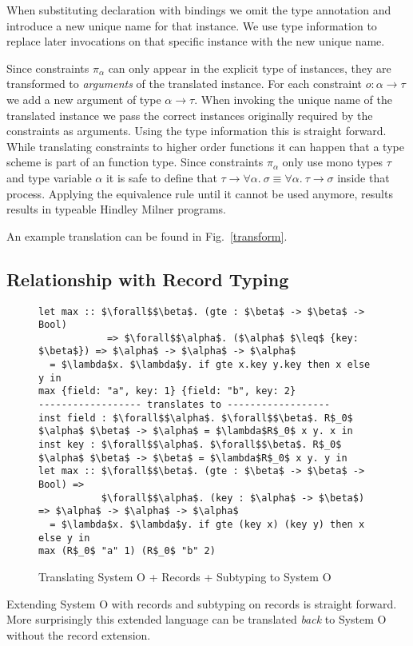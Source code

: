 \documentclass[runningheads]{llncs}
\newcommand{\snip}[1]{\footnotesize{\ttfamily{#1}}}
\begin{document}
When substituting \snip{inst} declaration with \snip{let} bindings we omit the type annotation and introduce a new unique name for that instance. 
We use type information to replace later invocations on that specific instance with the new unique name. 

Since constraints $\pi_\alpha$ can only appear in the explicit type of instances, they are transformed to \emph{arguments} of the translated instance.
For each constraint $o : \alpha \rightarrow \tau$ we add a new argument of type $\alpha \rightarrow \tau$. 
When invoking the unique name of the translated instance we pass the correct instances originally required by the constraints as arguments. 
Using the type information this is straight forward. 
While translating constraints to higher order functions it can happen that a type scheme is part of an function type. 
Since constraints $\pi_\alpha$ only use mono types $\tau$ and type variable $\alpha$ it is safe to define that $\tau \rightarrow \forall \alpha. \ \sigma \equiv \forall \alpha. \ \tau \rightarrow \sigma$ inside that process.
Applying the equivalence rule until it cannot be used anymore, results results in typeable Hindley Milner programs.

An example translation can be found in Fig.~\ref{transform}.

\subsection{Relationship with Record Typing}
\begin{figure}
  \begin{lstlisting}
let max :: $\forall$$\beta$. (gte : $\beta$ -> $\beta$ -> Bool) 
            => $\forall$$\alpha$. ($\alpha$ $\leq$ {key: $\beta$}) => $\alpha$ -> $\alpha$ -> $\alpha$      
  = $\lambda$x. $\lambda$y. if gte x.key y.key then x else y in
max {field: "a", key: 1} {field: "b", key: 2}
------------------ translates to ------------------
inst field : $\forall$$\alpha$. $\forall$$\beta$. R$_0$ $\alpha$ $\beta$ -> $\alpha$ = $\lambda$R$_0$ x y. x in
inst key : $\forall$$\alpha$. $\forall$$\beta$. R$_0$ $\alpha$ $\beta$ -> $\beta$ = $\lambda$R$_0$ x y. y in
let max :: $\forall$$\beta$. (gte : $\beta$ -> $\beta$ -> Bool) => 
           $\forall$$\alpha$. (key : $\alpha$ -> $\beta$) => $\alpha$ -> $\alpha$ -> $\alpha$
  = $\lambda$x. $\lambda$y. if gte (key x) (key y) then x else y in
max (R$_0$ "a" 1) (R$_0$ "b" 2)  
  \end{lstlisting}
  \caption{Translating System O + Records + Subtyping to System O~\cite{oww95}} \label{translate}
\end{figure}
Extending System O with records and subtyping on records is straight forward.
More surprisingly this extended language can be translated \emph{back} to System O without the record extension.
\end{document}
